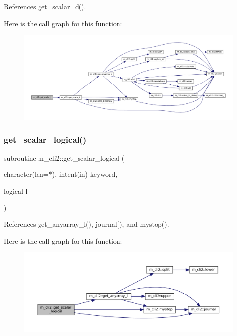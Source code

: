 References get\+\_\+scalar\+\_\+d().

Here is the call graph for this function\+:
\nopagebreak
\begin{figure}[H]
\begin{center}
\leavevmode
\includegraphics[width=350pt]{namespacem__cli2_a9c5208ef6763da7e68dd1e118bea0b7a_cgraph}
\end{center}
\end{figure}
\mbox{\label{namespacem__cli2_a138d07d14246ee532ce36e67719e8c7d}} 
\subsubsection{\texorpdfstring{get\+\_\+scalar\+\_\+logical()}{get\_scalar\_logical()}}
{\footnotesize\ttfamily subroutine m\+\_\+cli2\+::get\+\_\+scalar\+\_\+logical (\begin{DoxyParamCaption}\item[{character(len=$\ast$), intent(in)}]{keyword,  }\item[{logical}]{l }\end{DoxyParamCaption})\hspace{0.3cm}{\ttfamily [private]}}



References get\+\_\+anyarray\+\_\+l(), journal(), and mystop().

Here is the call graph for this function\+:\nopagebreak
\begin{figure}[H]
\begin{center}
\leavevmode
\includegraphics[width=350pt]{namespacem__cli2_a138d07d14246ee532ce36e67719e8c7d_cgraph}
\end{center}
\end{figure}
\mbox{\label{namespacem__cli2_ad089d91c66626de91bcda84523e80b54}} 
